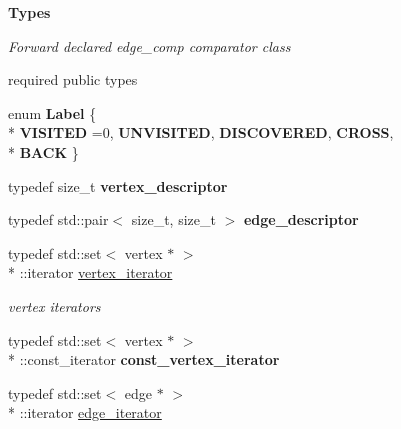 \begin{Indent}{\bf Types}\par
{\em Forward declared edge\+\_\+comp comparator class

required public types }\begin{DoxyCompactItemize}
\item 
\hypertarget{classmystl_1_1graph_ae8d072039125c2536419b9d4ad1ca577}{enum {\bfseries Label} \{ \\*
{\bfseries V\+I\+S\+I\+T\+E\+D} =0, 
{\bfseries U\+N\+V\+I\+S\+I\+T\+E\+D}, 
{\bfseries D\+I\+S\+C\+O\+V\+E\+R\+E\+D}, 
{\bfseries C\+R\+O\+S\+S}, 
\\*
{\bfseries B\+A\+C\+K}
 \}}\label{classmystl_1_1graph_ae8d072039125c2536419b9d4ad1ca577}

\item 
\hypertarget{classmystl_1_1graph_ad2732d0343911bde1277a7b8b293c256}{typedef size\+\_\+t {\bfseries vertex\+\_\+descriptor}}\label{classmystl_1_1graph_ad2732d0343911bde1277a7b8b293c256}

\item 
\hypertarget{classmystl_1_1graph_a5e841bf3fc28d6cec2de2ea326cd83ea}{typedef std\+::pair$<$ size\+\_\+t, size\+\_\+t $>$ {\bfseries edge\+\_\+descriptor}}\label{classmystl_1_1graph_a5e841bf3fc28d6cec2de2ea326cd83ea}

\item 
\hypertarget{classmystl_1_1graph_a173b6e21e17fd9bafdd7594b2ba3ef0a}{typedef std\+::set$<$ vertex $\ast$ $>$\\*
\+::iterator \hyperlink{classmystl_1_1graph_a173b6e21e17fd9bafdd7594b2ba3ef0a}{vertex\+\_\+iterator}}\label{classmystl_1_1graph_a173b6e21e17fd9bafdd7594b2ba3ef0a}

\begin{DoxyCompactList}\small\item\em vertex iterators \end{DoxyCompactList}\item 
\hypertarget{classmystl_1_1graph_a4b4067e095744d85290e63cb4c7c6d53}{typedef std\+::set$<$ vertex $\ast$ $>$\\*
\+::const\+\_\+iterator {\bfseries const\+\_\+vertex\+\_\+iterator}}\label{classmystl_1_1graph_a4b4067e095744d85290e63cb4c7c6d53}

\item 
\hypertarget{classmystl_1_1graph_aca4e86526b9606bc4a568b0c4e127b3f}{typedef std\+::set$<$ edge $\ast$ $>$\\*
\+::iterator \hyperlink{classmystl_1_1graph_aca4e86526b9606bc4a568b0c4e127b3f}{edge\+\_\+iterator}}\label{classmystl_1_1graph_aca4e86526b9606bc4a568b0c4e127b3f}


\end{DoxyCompactItemize}
\end{Indent}
